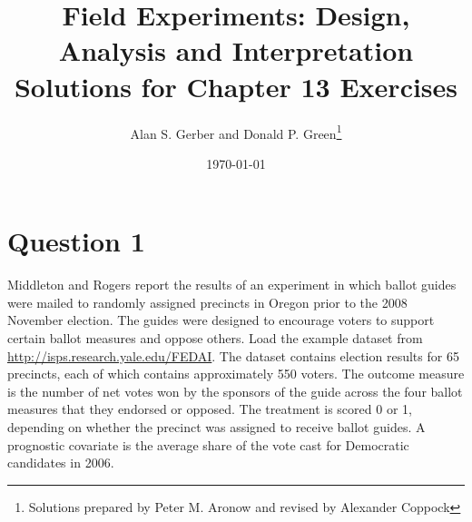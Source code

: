 \documentclass[11pt,notitlepage]{article}\usepackage[]{graphicx}\usepackage[]{color}
\title{Field Experiments: Design, Analysis and Interpretation \\
Solutions for Chapter 13 Exercises}
\author{Alan S. Gerber and Donald P. Green\footnote{Solutions prepared by Peter M. Aronow and revised by Alexander Coppock}}
\date{\today}
\begin{document}
\maketitle


\section*{Question 1}
Middleton and Rogers report the results of an experiment in which ballot guides were mailed to randomly assigned precincts in Oregon prior to the 2008 November election. The guides were designed to encourage voters to support certain ballot measures and oppose others. Load the example dataset from \url{http://isps.research.yale.edu/FEDAI}. The dataset contains election results for 65 precincts, each of which contains approximately 550 voters. The outcome measure is the number of net votes won by the sponsors of the guide across the four ballot measures that they endorsed or opposed. The treatment is scored 0 or 1, depending on whether the precinct was assigned to receive ballot guides. A prognostic covariate is the average share of the vote cast for Democratic candidates in 2006.
\end{document}

